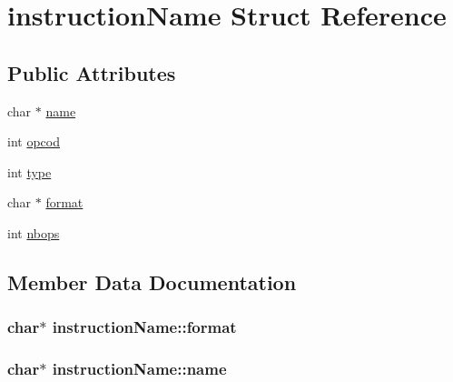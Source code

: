 \hypertarget{structinstructionName}{}\section{instruction\+Name Struct Reference}
\label{structinstructionName}
\subsection*{Public Attributes}
\begin{DoxyCompactItemize}
\item 
char $\ast$ \hyperlink{structinstructionName_adc814711203e570b23cdddc6eb4e8ba8}{name}
\item 
int \hyperlink{structinstructionName_a56fd802379b5c3d00a83cf4915b14de7}{opcod}
\item 
int \hyperlink{structinstructionName_a343ced7f4083a1a399a5195b5c6bc8a8}{type}
\item 
char $\ast$ \hyperlink{structinstructionName_abb0bc8249c6cce11dbf9cd72c8028f1f}{format}
\item 
int \hyperlink{structinstructionName_aecc3848e91d527de92cea2cd25c652d4}{nbops}
\end{DoxyCompactItemize}


\subsection{Member Data Documentation}
\subsubsection[{\texorpdfstring{format}{format}}]{\setlength{\rightskip}{0pt plus 5cm}char$\ast$ instruction\+Name\+::format}\hypertarget{structinstructionName_abb0bc8249c6cce11dbf9cd72c8028f1f}{}\label{structinstructionName_abb0bc8249c6cce11dbf9cd72c8028f1f}
\subsubsection[{\texorpdfstring{name}{name}}]{\setlength{\rightskip}{0pt plus 5cm}char$\ast$ instruction\+Name\+::name}\hypertarget{structinstructionName_adc814711203e570b23cdddc6eb4e8ba8}{}\label{structinstructionName_adc814711203e570b23cdddc6eb4e8ba8}
